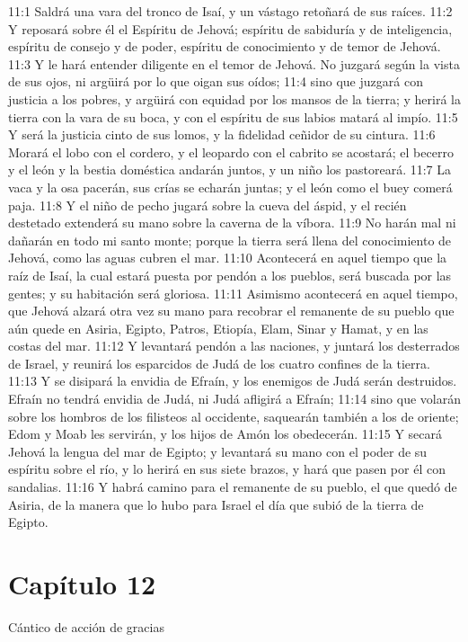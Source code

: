 11:1 Saldrá una vara del tronco de Isaí, y un vástago retoñará de sus raíces. 
11:2 Y reposará sobre él el Espíritu de Jehová; espíritu de sabiduría y de inteligencia, espíritu de consejo y de poder, espíritu de conocimiento y de temor de Jehová. 
11:3 Y le hará entender diligente en el temor de Jehová. No juzgará según la vista de sus ojos, ni argüirá por lo que oigan sus oídos; 
11:4 sino que juzgará con justicia a los pobres, y argüirá con equidad por los mansos de la tierra; y herirá la tierra con la vara de su boca, y con el espíritu de sus labios matará al impío. 
11:5 Y será la justicia cinto de sus lomos, y la fidelidad ceñidor de su cintura. 
11:6 Morará el lobo con el cordero, y el leopardo con el cabrito se acostará; el becerro y el león y la bestia doméstica andarán juntos, y un niño los pastoreará. 
11:7 La vaca y la osa pacerán, sus crías se echarán juntas; y el león como el buey comerá paja. 
11:8 Y el niño de pecho jugará sobre la cueva del áspid, y el recién destetado extenderá su mano sobre la caverna de la víbora. 
11:9 No harán mal ni dañarán en todo mi santo monte; porque la tierra será llena del conocimiento de Jehová, como las aguas cubren el mar. 
11:10 Acontecerá en aquel tiempo que la raíz de Isaí, la cual estará puesta por pendón a los pueblos, será buscada por las gentes; y su habitación será gloriosa. 
11:11 Asimismo acontecerá en aquel tiempo, que Jehová alzará otra vez su mano para recobrar el remanente de su pueblo que aún quede en Asiria, Egipto, Patros, Etiopía, Elam, Sinar y Hamat, y en las costas del mar. 
11:12 Y levantará pendón a las naciones, y juntará los desterrados de Israel, y reunirá los esparcidos de Judá de los cuatro confines de la tierra. 
11:13 Y se disipará la envidia de Efraín, y los enemigos de Judá serán destruidos. Efraín no tendrá envidia de Judá, ni Judá afligirá a Efraín; 
11:14 sino que volarán sobre los hombros de los filisteos al occidente, saquearán también a los de oriente; Edom y Moab les servirán, y los hijos de Amón los obedecerán. 
11:15 Y secará Jehová la lengua del mar de Egipto; y levantará su mano con el poder de su espíritu sobre el río, y lo herirá en sus siete brazos, y hará que pasen por él con sandalias. 
11:16 Y habrá camino para el remanente de su pueblo, el que quedó de Asiria, de la manera que lo hubo para Israel el día que subió de la tierra de Egipto. 
\section*{Capítulo 12 }
Cántico de acción de gracias 
 
